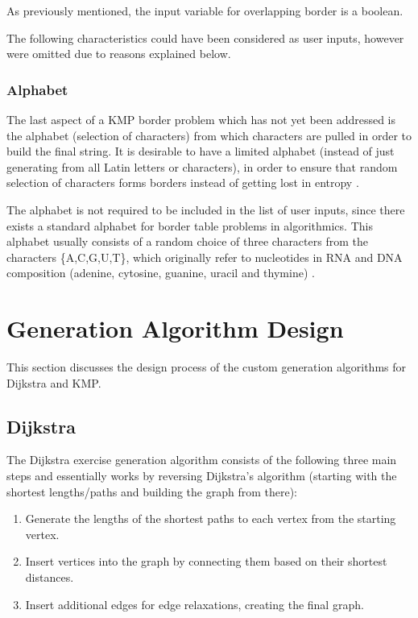 \documentclass{l4proj}
\begin{document}
As previously mentioned, the input variable for overlapping border is a boolean.

The following characteristics could have been considered as user inputs, however were omitted due to reasons explained below.

\subsubsection{Alphabet}

The last aspect of a KMP border problem which has not yet been addressed is the alphabet (selection of characters) from which characters are pulled in order to build the final string. It is desirable to have a limited alphabet (instead of just generating from all Latin letters or characters), in order to ensure that random selection of characters forms borders instead of getting lost in entropy \cite{a}.
 
The alphabet is not required to be included in the list of user inputs, since there exists a standard alphabet for border table problems in algorithmics. This alphabet usually consists of a random choice of three characters from the characters \{A,C,G,U,T\}, which originally refer to nucleotides in RNA and DNA composition (adenine, cytosine, guanine, uracil and thymine) \cite{a}.

\section{Generation Algorithm Design}

This section discusses the design process of the custom generation algorithms for Dijkstra and KMP.

\subsection{Dijkstra}
\label{sec:dgen}

The Dijkstra exercise generation algorithm consists of the following three main steps and essentially works by reversing Dijkstra's algorithm (starting with the shortest lengths/paths and building the graph from there):

\begin{enumerate}
	\item
	Generate the lengths of the shortest paths to each vertex from the starting vertex.
	\item
	Insert vertices into the graph by connecting them based on their shortest distances.
	\item
	Insert additional edges for edge relaxations, creating the final graph.
\end{enumerate}
\end{document}
